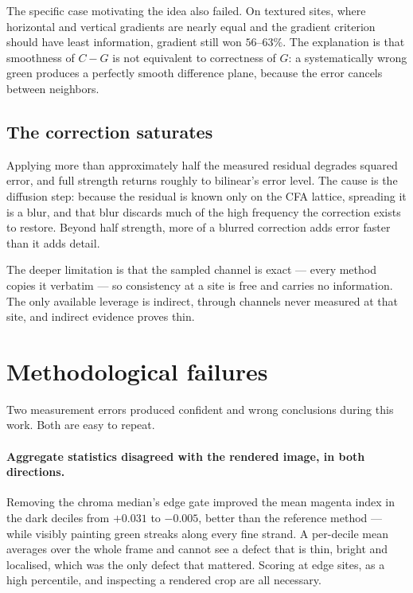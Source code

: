 \documentclass[10pt,a4paper]{article}
\begin{document}
The specific case motivating the idea also failed. On textured sites, where
horizontal and vertical gradients are nearly equal and the gradient criterion
should have least information, gradient still won $56$--$63\%$. The explanation
is that smoothness of $C - G$ is not equivalent to correctness of $G$: a
systematically wrong green produces a perfectly smooth difference plane,
because the error cancels between neighbors.

\subsection{The correction saturates}

Applying more than approximately half the measured residual degrades squared
error, and full strength returns roughly to bilinear's error level. The cause
is the diffusion step: because the residual is known only on the CFA lattice,
spreading it is a blur, and that blur discards much of the high frequency the
correction exists to restore. Beyond half strength, more of a blurred
correction adds error faster than it adds detail.

The deeper limitation is that the sampled channel is exact --- every method
copies it verbatim --- so consistency at a site is free and carries no
information. The only available leverage is indirect, through channels never
measured at that site, and indirect evidence proves thin.

\section{Methodological failures}
\label{sec:failures}

Two measurement errors produced confident and wrong conclusions during this
work. Both are easy to repeat.

\paragraph{Aggregate statistics disagreed with the rendered image, in both
directions.} Removing the chroma median's edge gate improved the mean magenta
index in the dark deciles from $+0.031$ to $-0.005$, better than the reference
method --- while visibly painting green streaks along every fine strand. A
per-decile mean averages over the whole frame and cannot see a defect that is
thin, bright and localised, which was the only defect that mattered. Scoring at
edge sites, as a high percentile, and inspecting a rendered crop are all
necessary.
\end{document}
